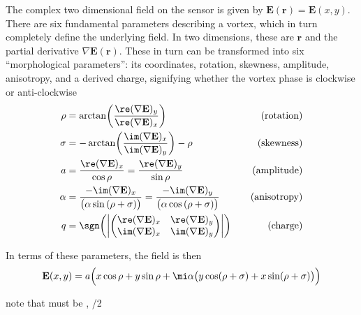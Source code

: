 The complex two dimensional field on the sensor is given by
$\mathbf{E}(\mathbf{r}) = \mathbf{E}(x,y)$.
There are six fundamental parameters describing a vortex, which in turn
completely define the underlying field.  In two dimensions, these are
$\mathbf{r}$ and the partial derivative $\nabla \mathbf{E}(\mathbf{r})$.
These in turn can be transformed into six ``morphological parameters'': its
coordinates, rotation, skewness, amplitude, anisotropy, and a derived
charge, signifying whether the vortex phase is clockwise or anti-clockwise
\begingroup
\newcommand{\rx}{\re(\nabla \mathbf{E})_x}
\newcommand{\ry}{\re(\nabla \mathbf{E})_y}
\newcommand{\ix}{\im(\nabla \mathbf{E})_x}
\newcommand{\iy}{\im(\nabla \mathbf{E})_y}
\begin{align}
\rho   &= \arctan\!\left(\frac{\ry}{\rx}\right) \quad & \text{(rotation)}\\
\sigma &= -\arctan\!\left(\frac{\ix}{\iy}\right)-\rho \quad & \text{(skewness)}\\
a      &= \frac{\rx}{\cos\rho} = \frac{\ry}{\sin\rho} \quad & \text{(amplitude)}\\
\alpha &= \frac{-\ix}{\bigl(\alpha \sin\left(\rho+\sigma\right)\bigr)}
        = \frac{-\iy}{\bigl(\alpha \cos\left(\rho+\sigma\right)\bigr)} \quad & \text{(anisotropy)} \\
q      &= \sgn\!\left( \left|
          \begin{pmatrix}
          \rx & \ry \\
          \ix & \iy
          \end{pmatrix}
          \right|\right) \quad & \text{(charge)}
\end{align}
\endgroup

In terms of these parameters, the field is then
\begin{equation}
\mathbf{E}(x,y) = a \Bigl( x \cos\rho + y \sin \rho 
+ \mi \alpha \bigr(y \cos(\rho + \sigma) + x \sin(\rho+\sigma)\bigr)\Bigr)
\end{equation}

note that \rho must be \pm \pi, \sigma \pm \pi/2

